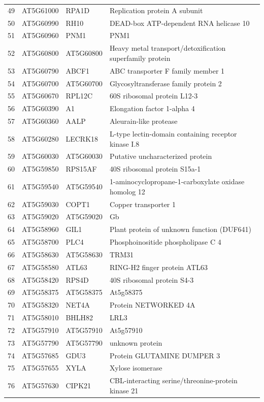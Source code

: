 \documentclass[11pt]{article}
\begin{document}
\begin{center}
\begin{tabular}{rlll}
49 & AT5G61000 & RPA1D & Replication protein A subunit\\
50 & AT5G60990 & RH10 & DEAD-box ATP-dependent RNA helicase 10\\
51 & AT5G60960 & PNM1 & PNM1\\
52 & AT5G60800 & AT5G60800 & Heavy metal transport/detoxification superfamily protein\\
53 & AT5G60790 & ABCF1 & ABC transporter F family member 1\\
54 & AT5G60700 & AT5G60700 & Glycosyltransferase family protein 2\\
55 & AT5G60670 & RPL12C & 60S ribosomal protein L12-3\\
56 & AT5G60390 & A1 & Elongation factor 1-alpha 4\\
57 & AT5G60360 & AALP & Aleurain-like protease\\
58 & AT5G60280 & LECRK18 & L-type lectin-domain containing receptor kinase I.8\\
59 & AT5G60030 & AT5G60030 & Putative uncharacterized protein\\
60 & AT5G59850 & RPS15AF & 40S ribosomal protein S15a-1\\
61 & AT5G59540 & AT5G59540 & 1-aminocyclopropane-1-carboxylate oxidase homolog 12\\
62 & AT5G59030 & COPT1 & Copper transporter 1\\
63 & AT5G59020 & AT5G59020 & Gb\\
64 & AT5G58960 & GIL1 & Plant protein of unknown function (DUF641)\\
65 & AT5G58700 & PLC4 & Phosphoinositide phospholipase C 4\\
66 & AT5G58630 & AT5G58630 & TRM31\\
67 & AT5G58580 & ATL63 & RING-H2 finger protein ATL63\\
68 & AT5G58420 & RPS4D & 40S ribosomal protein S4-3\\
69 & AT5G58375 & AT5G58375 & At5g58375\\
70 & AT5G58320 & NET4A & Protein NETWORKED 4A\\
71 & AT5G58010 & BHLH82 & LRL3\\
72 & AT5G57910 & AT5G57910 & At5g57910\\
73 & AT5G57790 & AT5G57790 & unknown protein\\
74 & AT5G57685 & GDU3 & Protein GLUTAMINE DUMPER 3\\
75 & AT5G57655 & XYLA & Xylose isomerase\\
76 & AT5G57630 & CIPK21 & CBL-interacting serine/threonine-protein kinase 21\\

\end{tabular}
\end{center}
\end{document}

